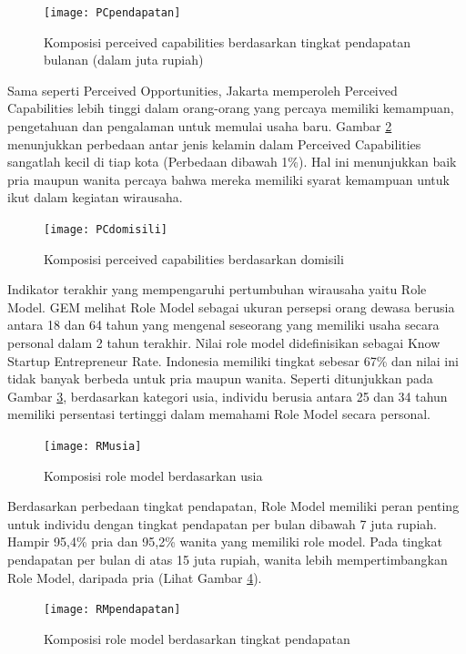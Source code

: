 \begin{figure} [ht]
	\centering  
	\texttt{[image: PCpendapatan]} 
	\caption[Komposisi perceived capabilities berdasarkan tingkat pendapatan bulanan (dalam juta rupiah)]{Komposisi perceived capabilities berdasarkan tingkat pendapatan bulanan (dalam juta rupiah)} 
	\label{fig:PCpendapatan} 
\end{figure}

Sama seperti Perceived Opportunities, Jakarta memperoleh Perceived Capabilities lebih tinggi dalam orang-orang yang percaya memiliki kemampuan, pengetahuan dan pengalaman untuk memulai usaha baru. Gambar \ref{fig:PCdomisili} menunjukkan perbedaan antar jenis kelamin dalam Perceived Capabilities sangatlah kecil di tiap kota (Perbedaan dibawah 1\%). Hal ini menunjukkan baik pria maupun wanita percaya bahwa mereka memiliki syarat kemampuan untuk ikut dalam kegiatan wirausaha.

\begin{figure} [H]
	\centering  
	\texttt{[image: PCdomisili]} 
	\caption[Komposisi perceived capabilities berdasarkan domisili]{Komposisi perceived capabilities berdasarkan domisili} 
	\label{fig:PCdomisili} 
\end{figure}

Indikator terakhir yang mempengaruhi pertumbuhan wirausaha yaitu Role Model. GEM melihat Role Model sebagai ukuran persepsi orang dewasa berusia antara 18 dan 64 tahun yang mengenal seseorang yang memiliki usaha secara personal dalam 2 tahun terakhir. Nilai role model didefinisikan sebagai Know Startup Entrepreneur Rate. Indonesia memiliki tingkat sebesar 67\% dan nilai ini tidak banyak berbeda untuk pria maupun wanita. Seperti ditunjukkan pada Gambar \ref{fig:RMusia}, berdasarkan kategori usia, individu berusia antara 25 dan 34 tahun memiliki persentasi tertinggi dalam memahami Role Model secara personal.


\begin{figure} [H]
	\centering  
	\texttt{[image: RMusia]} 
	\caption[Komposisi role model berdasarkan usia]{Komposisi role model berdasarkan usia} 
	\label{fig:RMusia} 
\end{figure}

Berdasarkan perbedaan tingkat pendapatan, Role Model memiliki peran penting untuk individu dengan tingkat pendapatan per bulan dibawah 7 juta rupiah. Hampir 95,4\% pria dan 95,2\% wanita yang memiliki role model. Pada tingkat pendapatan per bulan di atas 15 juta rupiah, wanita lebih mempertimbangkan Role Model, daripada pria (Lihat Gambar \ref{fig:RMpendapatan}).

\begin{figure} [H]
	\centering  
	\texttt{[image: RMpendapatan]} 
	\caption[Komposisi role model berdasarkan tingkat pendapatan]{Komposisi role model berdasarkan tingkat pendapatan} 
	\label{fig:RMpendapatan} 
\end{figure}